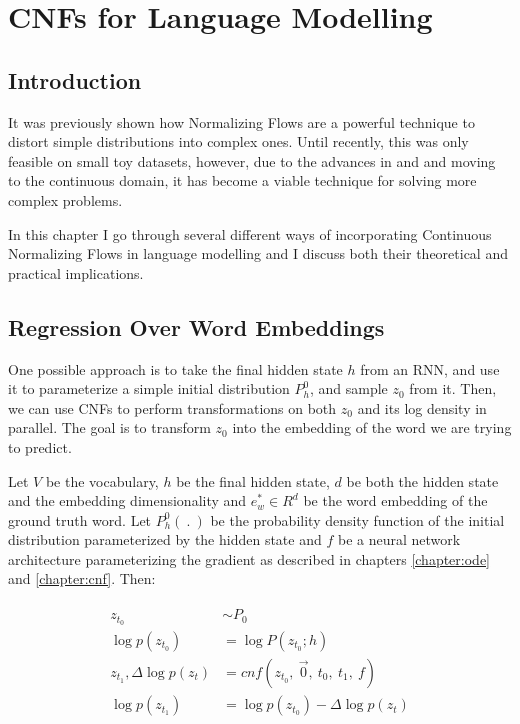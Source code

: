 \chapter{CNFs for Language Modelling}
\label{chapter:cnf_lm}

\section{Introduction}
\label{section:cnf_lm:introduction}

It was previously shown how Normalizing Flows are a powerful technique to distort simple distributions into complex ones. Until recently, this was only feasible on small toy datasets, however, due to the advances in \citet{chen2018neural} and \citet{grathwohl2018ffjord} and moving to the continuous domain, it has become a viable technique for solving more complex problems.


In this chapter I go through several different ways of incorporating Continuous Normalizing Flows in language modelling and I discuss both their theoretical and practical implications.


\section{Regression Over Word Embeddings}
\label{section:cnf_lm:regression}

One possible approach is to take the final hidden state $ h $ from an RNN, and use it to parameterize a simple initial distribution $ P_h^0 $, and sample $ z_0 $ from it. Then, we can use CNFs to perform transformations on both $ z_0 $ and its log density in parallel. The goal is to transform $ z_0 $ into the embedding of the word we are trying to predict.

Let $ V $ be the vocabulary, $ h $ be the final hidden state, $ d $ be both the hidden state and the embedding dimensionality and $ e_w^* \in R^{d} $ be the word embedding of the ground truth word. Let $ P_h^0( \ . \ ) $ be the probability density function of the initial distribution parameterized by the hidden state and $ f $ be a neural network architecture parameterizing the gradient as described in chapters \ref{chapter:ode} and \ref{chapter:cnf}. Then:

\begin{align}
    \label{equation:cnf_lm:regression:regression_word_embedding}
    \begin{split}
        z_{t_0} &\sim P_0 \\
        \log p(z_{t_0}) &= \log P(z_{t_0}; h) \\
        z_{t_1}, \Delta \log p (z_t) &= cnf(z_{t_0}, \ \vec{0}, \ t_0 , \ t_1 , \ f) \\
        \log p (z_{t_1}) &= \log p(z_{t_0}) -  \Delta \log  p (z_t)
    \end{split}
\end{align}

